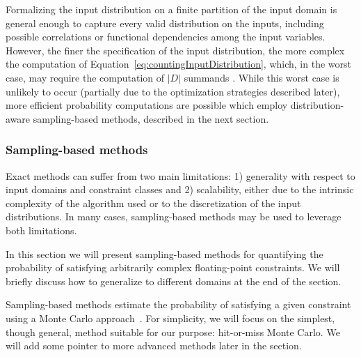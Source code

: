 Formalizing the input distribution on a finite partition of the input domain is general enough to capture every valid distribution on the inputs, including possible correlations or functional dependencies among the input variables. However, the finer the specification of the input distribution, the more complex the computation of Equation~\eqref{eq:countingInputDistribution}, which, in the worst case, may require the computation of $|D|$ summands \cite{Borges2014}. While this worst case is unlikely to occur (partially due to the optimization strategies described later), more efficient probability computations are possible which employ distribution-aware sampling-based methods, described in the next section.

\subsubsection{Sampling-based methods}\label{sec:computingprobabilitiesSampling}
Exact methods can suffer from two main limitations: 1) generality with respect to input domains and constraint classes and 2) scalability, either due to the intrinsic complexity of the algorithm used or to the discretization of the input distributions. In many cases, sampling-based methods may be used to leverage both limitations.

In this section we will present sampling-based methods for quantifying the probability of satisfying arbitrarily complex floating-point constraints. We will briefly discuss how to generalize to different domains at the end of the section.

Sampling-based methods estimate the probability of satisfying a given constraint using a Monte Carlo approach~\cite{robert2013monte}. For simplicity, we will focus on the simplest, though general, method suitable for our purpose: hit-or-miss Monte Carlo. We will add some pointer to more advanced methods later in the section.


